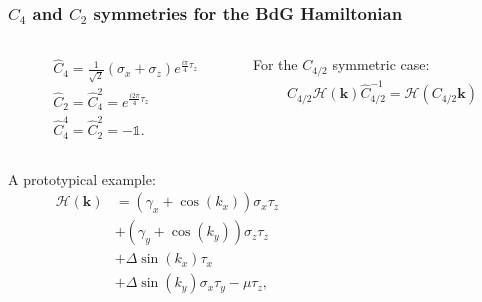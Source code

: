 \documentclass{beamer}
\renewcommand{\(}{\left(}
\renewcommand{\)}{\right)}
\renewcommand{\[}{\left[}
\renewcommand{\]}{\right]}
\begin{document}
\begin{frame}
    \frametitle{$C_4$ and $C_2$ symmetries for the BdG Hamiltonian}
    \begin{columns}
    \begin{column}{0.5\textwidth}
        \begin{align*}
            &\hat{C}_4 = \frac{1}{\sqrt{2}} (\sigma_x + \sigma_z) e^{\frac{i\pi}{4}\tau_z} \\
            &\hat{C}_2 = \hat C_4^2 = e^{\frac{i2\pi}{4}\tau_z} \\
            &\hat{C}_4^4 = \hat C_2^2 =  - \mathbb{1}.
        \end{align*}
    \end{column}
    \begin{column}{0.5\textwidth}
        For the $C_{4/2}$ symmetric case: 
        \begin{align*}
            \hat{C}_{4/2} \mathcal{H}(\bm k) \hat{C}^{-1}_{4/2} = \mathcal{H}(C_{4/2} \bm k)
        \end{align*}
    \end{column}
    \end{columns}\pause 
    \begin{columns}
        \begin{column}{0.45\textwidth}
            A prototypical example: 
            \begin{align*}
                \mathcal{H}(\bm k) &= (\gamma_x + \cos(k_x)) \sigma_x \tau_z \\ 
                & + (\gamma_y + \cos(k_y))\sigma_z \tau_z \\
                & +\Delta \sin(k_x) \tau_x \\
                &+ \Delta \sin(k_y) \sigma_x \tau_y -\mu \tau_z,
            \end{align*} 
        \end{column}
        \begin{column}{0.55\textwidth}
            \begin{figure}[]
                \centering
            \end{figure}
        \end{column}
    \end{columns}
\end{frame}
\end{document}
